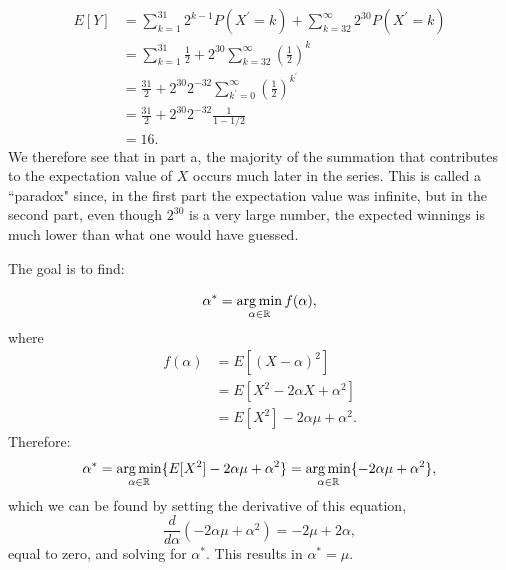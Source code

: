 \begin{problem}{22}
\begin{enumerate}
\begin{align*}
E[Y]&=\sum_{k=1}^{31}2^{k-1}P(X^\prime=k)+\sum_{k=32}^{\infty}2^{30}P(X^\prime=k)\\
& = \sum_{k=1}^{31}\frac{1}{2}+2^{30}\sum_{k=32}^{\infty}\left(\frac{1}{2}\right)^k\\
& = \frac{31}{2}+2^{30}2^{-32}\sum_{k^\prime=0}^{\infty}\left(\frac{1}{2}\right)^{k^\prime}\\
& =  \frac{31}{2}+2^{30}2^{-32}\frac{1}{1-1/2} \\
& = 16.
\end{align*}
We therefore see that in part a, the majority of the summation that contributes to the expectation value of $X$ occurs much later in the series.  This is called a ``paradox" since, in the first part the expectation value was infinite, but in the second part, even though $2^{30}$ is a very large number, the expected winnings is much lower than what one would have guessed.


\end{enumerate}

\end{problem}


\begin{problem}{23}  The goal is to find:

\begin{equation*}
\alpha^{*}= \operatorname*{arg\,min}_{\alpha \in \mathbb R} f(\alpha),
\end{equation*}
where
\begin{align*}
f(\alpha) &= E[(X-\alpha)^2] \\
&=E[X^2-2\alpha X+\alpha^2] \\
&=E[X^2]-2 \alpha \mu +\alpha^2.
\end{align*}
Therefore:
\begin{equation*}
\alpha^{*}= \operatorname*{arg\,min}_{\alpha \in \mathbb R} \{ E[X^2]-2 \alpha \mu +\alpha^2 \} = \operatorname*{arg\,min}_{\alpha \in \mathbb R} \{-2 \alpha \mu +\alpha^2\}, 
\end{equation*}
which we can be found by setting the derivative of this equation,
\begin{equation*}
\frac{d}{d \alpha} (-2 \alpha \mu +\alpha^2) = -2\mu+2\alpha,
\end{equation*}
equal to zero, and solving for $\alpha^{*}$.  This results in $\alpha^* = \mu$.



\end{problem}

